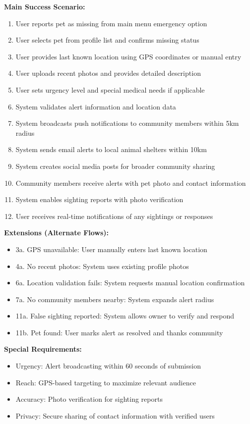 \textbf{Main Success Scenario:}
\begin{enumerate}
    \item User reports pet as missing from main menu emergency option
    \item User selects pet from profile list and confirms missing status
    \item User provides last known location using GPS coordinates or manual entry
    \item User uploads recent photos and provides detailed description
    \item User sets urgency level and special medical needs if applicable
    \item System validates alert information and location data
    \item System broadcasts push notifications to community members within 5km radius
    \item System sends email alerts to local animal shelters within 10km
    \item System creates social media posts for broader community sharing
    \item Community members receive alerts with pet photo and contact information
    \item System enables sighting reports with photo verification
    \item User receives real-time notifications of any sightings or responses
\end{enumerate}

\textbf{Extensions (Alternate Flows):}
\begin{itemize}
    \item 3a. GPS unavailable: User manually enters last known location
    \item 4a. No recent photos: System uses existing profile photos
    \item 6a. Location validation fails: System requests manual location confirmation
    \item 7a. No community members nearby: System expands alert radius
    \item 11a. False sighting reported: System allows owner to verify and respond
    \item 11b. Pet found: User marks alert as resolved and thanks community
\end{itemize}

\textbf{Special Requirements:}
\begin{itemize}
    \item Urgency: Alert broadcasting within 60 seconds of submission
    \item Reach: GPS-based targeting to maximize relevant audience
    \item Accuracy: Photo verification for sighting reports
    \item Privacy: Secure sharing of contact information with verified users
\end{itemize}

